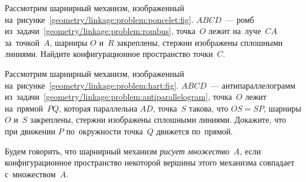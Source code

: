 \begin{problems}
\item{}
\label{geometry/linkage:problem:poncelet}%
Рассмотрим шарнирный механизм, изображенный
на~рисунке~\ref{geometry/linkage:problem:poncelet:fig}.
$ABCD$~--- ромб из~задачи~\ref{geometry/linkage:problem:rombus},
точка~$O$ лежит на~луче~$CA$ за~точкой~$A$,
шарниры $O$ и~$R$ закреплены, стержни изображены сплошными линиями.
Найдите конфигурационное пространство точки~$C$.

\item{}
\label{geometry/linkage:problem:hart}%
Рассмотрим шарнирный механизм, изображенный
на~рисунке~\ref{geometry/linkage:problem:hart:fig}.
$ABCD$~--- антипараллелограмм
из~задачи~\ref{geometry/linkage:problem:antiparallelogram},
точка~$O$ лежит на~прямой~$PQ$, которая параллельна $AD$, точка~$S$ такова,
что $OS = SP$, шарниры $O$ и~$S$ закреплены, стержни изображены сплошными
линиями.
Докажите, что при движении $P$ по~окружности точка~$Q$ движется по~прямой.

\end{problems}

Будем говорить, что шарнирный механизм \emph{рисует множество~$A$}, если
конфигурационное пространство некоторой вершины этого механизма совпадает
с~множеством~$A$.

